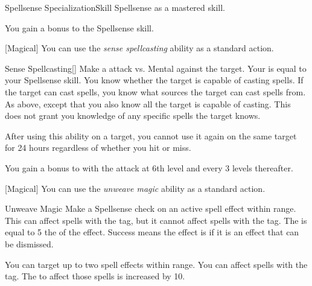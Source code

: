     \begin{feat}{Spellsense Specialization}{Skill}
        \featpre Spellsense as a mastered skill.

         You gain a  bonus to the Spellsense skill.

        [Magical] You can use the \textit{sense spellcasting} ability as a standard action.
        \begin{freeability}{Sense Spellcasting}[]
            Make a attack vs. Mental against the target.
            Your  is equal to your Spellsense skill.
            \hit You know whether the target is capable of casting spells.
            If the target can cast spells, you know what sources the target can cast spells from.
            \crit As above, except that you also know all  the target is capable of casting.
            This does not grant you knowledge of any specific spells the target knows.

            After using this ability on a target, you cannot use it again on the same target for 24 hours regardless of whether you hit or miss.

            \rankline
            You gain a  bonus to  with the attack at 6th level and every 3 levels thereafter.
        \end{freeability}

        [Magical] You can use the \textit{unweave magic} ability as a standard action.
        \begin{freeability}{Unweave Magic}
            Make a Spellsense check on an active spell effect within \rngmed range.
            This can affect spells with the  tag, but it cannot affect spells with the  tag.
            The  is equal to 5 \add the  of the effect.
            Success means the effect is  if it is an effect that can be dismissed.

            \rankline
             You can target up to two spell effects within range.
             You can affect spells with the  tag.
            The  to affect those spells is increased by 10.
        \end{freeability}


\end{feat}
